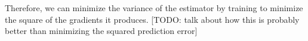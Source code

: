 \documentclass{article}
\newcommand{\relaxed}{r}
\newcommand{\var}{\mathbb{V}}
\begin{document}
Therefore, we can minimize the variance of the estimator by training to minimize the square of the gradients it produces.
[TODO: talk about how this is probably better than minimizing the squared prediction error]






\end{document}
